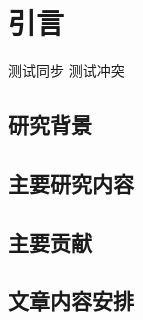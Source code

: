 \chapter{引言}
\label{cha:intro}
测试同步
测试冲突


\section{研究背景}
\label{sec:background}

\section{主要研究内容}
\label{sec:work}

\section{主要贡献}
\label{sec:contribution}

\section{文章内容安排}
\label{sec:contribution}

